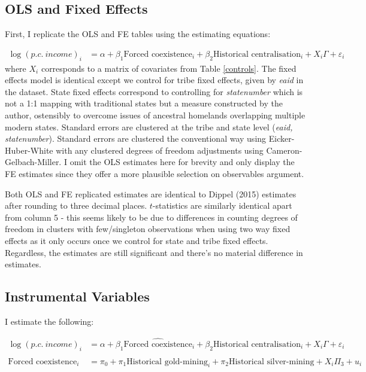 \documentclass{article}
\begin{document}
\subsection{ OLS and Fixed Effects}
First, I replicate the OLS and FE tables using the estimating equations:

\begin{align*}
    \log(p.c. \ income)_i &= \alpha + \beta_1 \text{Forced coexistence}_i   + \beta_2 \text{Historical centralisation}_i + X_i \Gamma  + \varepsilon_i
\end{align*}
 where $X_i$ corresponds to a matrix of covariates from Table \ref{controls}. The 
 fixed effects model is identical except we control for tribe fixed effects, given by \textit{eaid} in the dataset. State fixed 
 effects correspond to controlling for \textit{statenumber} which is not a 1:1 mapping with traditional states but a measure 
 constructed by the author, ostensibly to overcome issues of ancestral homelands overlapping multiple modern states. Standard 
 errors are clustered at the tribe and state level (\textit{eaid, statenumber}). Standard errors are clustered the conventional way using 
 Eicker-Huber-White with any clustered degrees of freedom adjustments using Cameron-Gelbach-Miller. I omit the OLS estimates here for brevity
 and only display the FE estimates since they offer a more plausible selection on observables argument. 
% 




% 
% 




Both OLS and FE replicated estimates are identical to Dippel (2015) estimates 
after rounding to three decimal places. $t$-statistics are similarly identical apart 
from column 5 - this seems likely to be due to differences in counting degrees of freedom in clusters
with few/singleton observations when using two way fixed effects as it only occurs once we control for state and tribe fixed effects. 
Regardless, the estimates are still significant and there's no material difference in estimates.

\subsection{Instrumental Variables}
I estimate the following:

\begin{align*}
    \log(p.c. \ income)_i &= \alpha + \beta_1 \widehat{\text{Forced coexistence}}_i   + \beta_2 \text{Historical centralisation}_i + X_i \Gamma  + \varepsilon_i \\ \\
\text{Forced coexistence}_i &= \pi_0 + \pi_1 \text{Historical gold-mining}_i + \pi_2 \text{Historical silver-mining} + X_i \Pi_3 + u_i
\end{align*}
\end{document}
